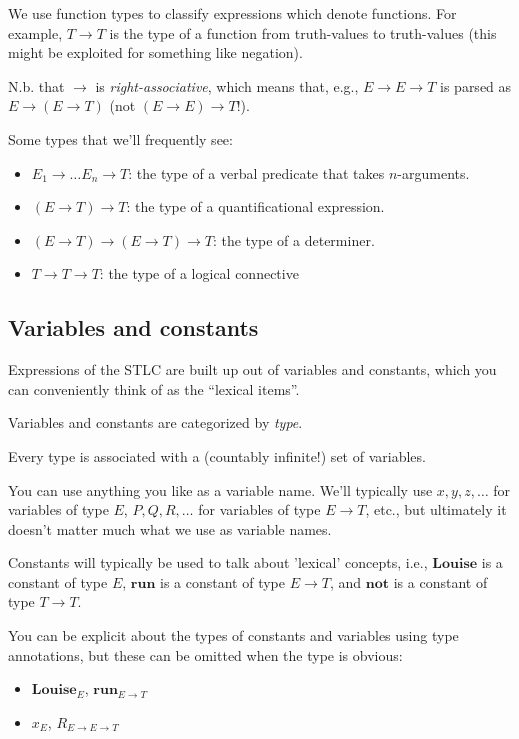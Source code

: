 \documentclass[letterpaper,parskip=half]{scrartcl}
\begin{document}
We use function types to classify expressions which denote functions. For example, \(T \to T\) is the type of a function from truth-values to truth-values (this might be exploited for something like negation).

N.b. that \(\to\) is \emph{right-associative}, which means that, e.g., \(E \to E \to  T\) is parsed as \(E \to (E \to T)\) (not \((E \to  E) \to  T\)!).

Some types that we'll frequently see:

\begin{itemize}
\item \(E_1 \to \ldots E_n \to T\): the type of a verbal predicate that takes \(n\)-arguments.
\item \((E \to T) \to T\): the type of a quantificational expression.
\item \((E \to T) \to (E \to T) \to T\): the type of a determiner.
\item \(T \to T \to T\): the type of a logical connective
\end{itemize}


\subsection{Variables and constants}
\label{sec:org022ee7f}

Expressions of the STLC are built up out of variables and constants, which you can conveniently think of as the ``lexical items''.

Variables and constants are categorized by \emph{type}.

Every type is associated with a (countably infinite!) set of variables.

You can use anything you like as a variable name. We'll typically use \(x,y,z,\ldots\) for variables of type \(E\), \(P,Q,R,\ldots\) for variables of type \(E \to T\), etc., but ultimately it doesn't matter much what we use as variable names. 

Constants will typically be used to talk about 'lexical' concepts, i.e., \(\mathbf{Louise}\) is a constant of type \(E\), \(\mathbf{run}\) is a constant of type \(E \to T\), and \(\mathbf{not}\) is a constant of type \(T \to T\).

You can be explicit about the types of constants and variables using type annotations, but these can be omitted when the type is obvious:


\begin{itemize}
\item \(\mathbf{Louise}_E\), \(\mathbf{run}_{E \to T}\)
\item \(x_E\), \(R_{E \to E \to T}\)
\end{itemize}
\end{document}
